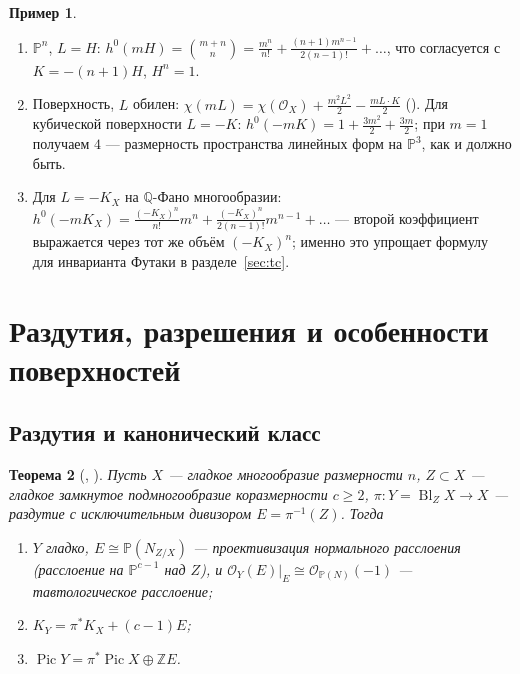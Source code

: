 \documentclass[11pt,a4paper]{article}
\theoremstyle{plain}
\newtheorem{theorem}{Теорема}[section]
\theoremstyle{definition}
\newtheorem{example}[theorem]{Пример}
\theoremstyle{remark}
\newcommand{\Z}{\mathbb{Z}}
\newcommand{\Q}{\mathbb{Q}}
\newcommand{\PP}{\mathbb{P}}
\newcommand{\cO}{\mathcal{O}}
\DeclareMathOperator{\Pic}{Pic}
\DeclareMathOperator{\Bl}{Bl}
\begin{document}
\begin{example}
\begin{enumerate}
\item $\PP^n$, $L=H$: $h^0(mH)=\binom{m+n}{n}=\frac{m^n}{n!}+\frac{(n+1)m^{n-1}}{2(n-1)!}+\dots$,
что согласуется с $K=-(n+1)H$, $H^n=1$.
\item Поверхность, $L$ обилен: $\chi(mL)=\chi(\cO_X)+\frac{m^2L^2}2-\frac{mL\cdot K}2$
(\cite[теорема~0.22]{AG}). Для кубической поверхности $L=-K$: $h^0(-mK)=1+\frac{3m^2}2+\frac{3m}2$;
при $m=1$ получаем $4$ --- размерность пространства линейных форм на $\PP^3$, как и должно быть.
\item Для $L=-K_X$ на $\Q$-Фано многообразии: $h^0(-mK_X)=\frac{(-K_X)^n}{n!}m^n+\frac{(-K_X)^n}{2(n-1)!}m^{n-1}+\dots$
--- второй коэффициент выражается через тот же объём $(-K_X)^n$; именно это упрощает формулу для
инварианта Футаки в разделе~\ref{sec:tc}.
\end{enumerate}
\end{example}

\section{Раздутия, разрешения и особенности поверхностей}\label{sec:sing}

\subsection{Раздутия и канонический класс}

\begin{theorem}[{\cite[II.8.24, II, упр.~8.5]{Ha}, \cite[7.6]{AG}}]\label{thm:blowup-K}
Пусть $X$ --- гладкое многообразие размерности $n$, $Z\subset X$ --- гладкое замкнутое
подмногообразие коразмерности $c\ge2$, $\pi\colon Y=\Bl_ZX\to X$ --- раздутие с исключительным
дивизором $E=\pi^{-1}(Z)$. Тогда
\begin{enumerate}
\item $Y$ гладко, $E\cong\PP(N_{Z/X})$ --- проективизация нормального расслоения (расслоение на
$\PP^{c-1}$ над $Z$), и $\cO_Y(E)|_E\cong\cO_{\PP(N)}(-1)$ --- тавтологическое расслоение;
\item $K_Y=\pi^*K_X+(c-1)E$;
\item $\Pic Y=\pi^*\Pic X\oplus\Z E$.
\end{enumerate}
\end{theorem}
\end{document}
